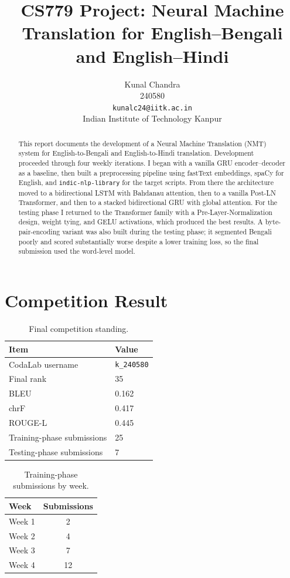 \documentclass[11pt, oneside]{article}
\title{CS779 Project: Neural Machine Translation for English--Bengali and English--Hindi}
\author{
    Kunal Chandra \\
    240580 \\
    {\tt kunalc24@iitk.ac.in} \\
    {Indian Institute of Technology Kanpur}
}
\date{}
\begin{document}
\maketitle

\begin{abstract}
This report documents the development of a Neural Machine Translation (NMT) system for
English-to-Bengali and English-to-Hindi translation. Development proceeded through four
weekly iterations. I began with a vanilla GRU encoder--decoder as a baseline, then built a
preprocessing pipeline using fastText embeddings, spaCy for English, and
\texttt{indic-nlp-library} for the target scripts. From there the architecture moved to a
bidirectional LSTM with Bahdanau attention, then to a vanilla Post-LN Transformer, and then
to a stacked bidirectional GRU with global attention. For the testing phase I returned to the
Transformer family with a Pre-Layer-Normalization design, weight tying, and GELU activations,
which produced the best results. A byte-pair-encoding variant was also built during the
testing phase; it segmented Bengali poorly and scored substantially worse despite a lower
training loss, so the final submission used the word-level model.
\end{abstract}

\section{Competition Result}

\begin{table}[h!]
\centering
\small
\begin{tabular}{@{}ll@{}}
\toprule
Item & Value \\
\midrule
CodaLab username & \texttt{k\_240580} \\
Final rank & 35 \\
BLEU & 0.162 \\
chrF & 0.417 \\
ROUGE-L & 0.445 \\
Training-phase submissions & 25 \\
Testing-phase submissions & 7 \\
\bottomrule
\end{tabular}
\caption{Final competition standing.}
\end{table}

\begin{table}[h!]
\centering
\small
\begin{tabular}{@{}lc@{}}
\toprule
Week & Submissions \\
\midrule
Week 1 & 2 \\
Week 2 & 4 \\
Week 3 & 7 \\
Week 4 & 12 \\
\bottomrule
\end{tabular}
\caption{Training-phase submissions by week.}
\end{table}
\end{document}
